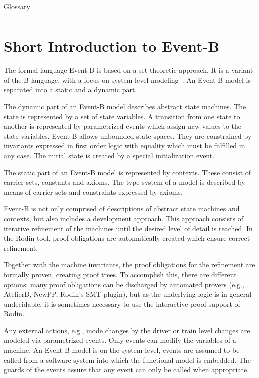 \documentclass{template/openetcs_article}
\begin{document}
\begin{table}[ht]
  \centering
  \begin{tabular}[ht]{|l|l|}
    \hline
    \hline
  \end{tabular}
  \caption{Glossary}
  \label{tab:glossary}
\end{table}

\section{Short Introduction to Event-B}
\label{sec:short-intr-event}

The formal language Event-B is based on a set-theoretic approach. It is a
variant of the B language, with a focus on system level
modeling~\cite{abrial-eventB-Book}. An Event-B model is separated into a static
and a dynamic part.

The dynamic part of an Event-B model describes abstract state machines. The
state is represented by a set of state variables. A transition from one state to
another is represented by parametrized events which assign new values to the
state variables. Event-B allows unbounded state spaces. They are constrained by
invariants expressed in first order logic with equality which must be fulfilled
in any case. The initial state is created by a special initialization event.

The static part of an Event-B model is represented by contexts. These consist of
carrier sets, constants and axioms. The type system of a model is described by
means of carrier sets and constraints expressed by axioms.

Event-B is not only comprised of descriptions of abstract state machines and
contexts, but also includes a development approach. This approach consists of
iterative refinement of the machines until the desired level of detail is
reached. In the Rodin tool, proof obligations are automatically created which
ensure correct refinement.

Together with the machine invariants, the proof obligations for the refinement
are formally proven, creating proof trees. To accomplish this, there are
different options: many proof obligations can be discharged by automated provers
(e.g., AtelierB, NewPP, Rodin's SMT-plugin), but as the underlying logic is in
general undecidable, it is sometimes necessary to use the interactive proof
support of Rodin.

Any external actions, e.g., mode changes by the driver or train level changes
are modeled via parametrized events. Only events can modify the variables of a
machine. An Event-B model is on the system level, events are assumed to be
called from a software system into which the functional model is embedded. The
guards of the events assure that any event can only be called when appropriate.
\end{document}
